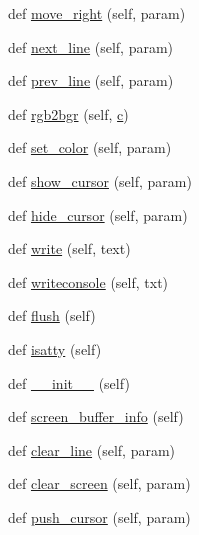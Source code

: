 \begin{DoxyCompactItemize}
def \hyperlink{classwaflib_1_1ansiterm_1_1_ansi_term_a1388984c5cb5051d6c48682d1cd998b7}{move\+\_\+right} (self, param)
\item 
def \hyperlink{classwaflib_1_1ansiterm_1_1_ansi_term_a8ce79cf478dc1bf0cec2c12e28103522}{next\+\_\+line} (self, param)
\item 
def \hyperlink{classwaflib_1_1ansiterm_1_1_ansi_term_ac65f3453904e9c561f530b7c43e73f12}{prev\+\_\+line} (self, param)
\item 
def \hyperlink{classwaflib_1_1ansiterm_1_1_ansi_term_ad097d16ecb1babcef5970faccad1e7e9}{rgb2bgr} (self, \hyperlink{rfft2d_test_m_l_8m_ae0323a9039add2978bf5b49550572c7c}{c})
\item 
def \hyperlink{classwaflib_1_1ansiterm_1_1_ansi_term_a2b56ee3c8294f7e2e5bca7cc60e8ee05}{set\+\_\+color} (self, param)
\item 
def \hyperlink{classwaflib_1_1ansiterm_1_1_ansi_term_a594f6cf62d5e4ca33f2b88127fd6393d}{show\+\_\+cursor} (self, param)
\item 
def \hyperlink{classwaflib_1_1ansiterm_1_1_ansi_term_a2ca4bde33edd4afa92c8bda3f01d1dc9}{hide\+\_\+cursor} (self, param)
\item 
def \hyperlink{classwaflib_1_1ansiterm_1_1_ansi_term_a03ecdf1c9e54a69800aae320175c281b}{write} (self, text)
\item 
def \hyperlink{classwaflib_1_1ansiterm_1_1_ansi_term_a8296f875a3fd0a03fc109073f2a73a3e}{writeconsole} (self, txt)
\item 
def \hyperlink{classwaflib_1_1ansiterm_1_1_ansi_term_a08667242c11cdfd8b74d64f8191d4938}{flush} (self)
\item 
def \hyperlink{classwaflib_1_1ansiterm_1_1_ansi_term_a08e698612e76adc1aa3e26cdc5cb2009}{isatty} (self)
\item 
def \hyperlink{classwaflib_1_1ansiterm_1_1_ansi_term_ab397a7401f836bb9f96d9e54c6333821}{\+\_\+\+\_\+init\+\_\+\+\_\+} (self)
\item 
def \hyperlink{classwaflib_1_1ansiterm_1_1_ansi_term_afdb1bac8f2508bdf2279320b85286196}{screen\+\_\+buffer\+\_\+info} (self)
\item 
def \hyperlink{classwaflib_1_1ansiterm_1_1_ansi_term_ae9df276c42e0569ad63c20c19de62b93}{clear\+\_\+line} (self, param)
\item 
def \hyperlink{classwaflib_1_1ansiterm_1_1_ansi_term_aa94cc04f29c4c51e0013e5cb87c0fd07}{clear\+\_\+screen} (self, param)
\item 
def \hyperlink{classwaflib_1_1ansiterm_1_1_ansi_term_a9f489138508401c64c6927f215d8d6da}{push\+\_\+cursor} (self, param)

\end{DoxyCompactItemize}
